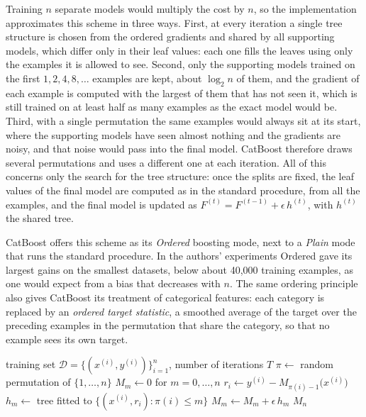 Training $n$ separate models would
multiply the cost by $n$, so the implementation approximates this scheme in
three ways. First, at every iteration a single tree structure is chosen from
the ordered gradients and shared by all supporting models, which differ only
in their leaf values: each one fills the leaves using only the examples it is
allowed to see. Second, only the
supporting models trained on the first $1, 2, 4, 8, \dots$ examples are
kept, about $\log_2 n$ of them, and the gradient of each example is computed
with the largest of them that has not seen it, which is still trained on at
least half as many examples as the exact model would
be. Third, with a single permutation the
same examples would always sit at its start, where the supporting models have
seen almost nothing and the gradients are noisy, and that noise would pass
into the final model. CatBoost therefore draws several permutations and uses a
different one at each iteration. All of this concerns
only the search for the tree structure: once the splits are fixed, the leaf
values of the final model are computed as in the standard procedure, from all
the examples, and the final model is
updated as $F^{(t)} = F^{(t-1)} + \epsilon\, h^{(t)}$, with $h^{(t)}$ the
shared tree.

CatBoost offers this scheme as its \emph{Ordered} boosting mode, next to a
\emph{Plain} mode that runs the standard procedure. In the authors'
experiments Ordered gave its largest gains on the smallest datasets, below
about 40{,}000 training examples, as one would expect from a bias that
decreases with $n$. The same ordering principle also
gives CatBoost its treatment of categorical features: each category is
replaced by an \emph{ordered target statistic}, a smoothed average of the
target over the preceding examples in the permutation that share the
category, so that no example sees its own target.

\begin{algorithm}[t]
\caption{Ordered boosting, idealized version~\cite{prokhorenkova2018}}
\label{alg:bg:gbm:ordered}
\begin{algorithmic}[1]
\Require training set $\mathcal{D} = \{(x^{(i)}, y^{(i)})\}_{i=1}^{n}$,
         number of iterations $T$
\State $\pi \gets$ random permutation of $\{1, \dots, n\}$
\State $M_m \gets 0$ for $m = 0, \dots, n$
    \State $r_i \gets y^{(i)} - M_{\pi(i)-1}\bigl(x^{(i)}\bigr)$
  \EndFor
    \State $h_m \gets$ tree fitted to $\{(x^{(i)}, r_i) : \pi(i) \le m\}$
    \State $M_m \gets M_m + \epsilon\, h_m$
  \EndFor
\EndFor
\State \Return $M_n$
\end{algorithmic}
\end{algorithm}

